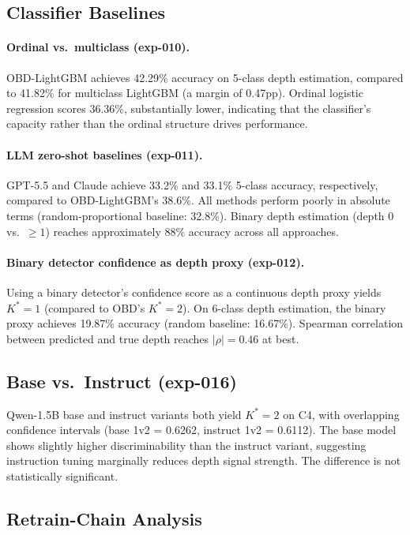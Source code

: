 \documentclass[11pt,a4paper]{article}
\begin{document}
\subsection{Classifier Baselines}
\label{sec:baselines}

\paragraph{Ordinal vs.\ multiclass (exp-010).}
OBD-LightGBM achieves 42.29\% accuracy on 5-class depth estimation, compared to 41.82\% for multiclass LightGBM (a margin of 0.47pp). Ordinal logistic regression scores 36.36\%, substantially lower, indicating that the classifier's capacity rather than the ordinal structure drives performance.

\paragraph{LLM zero-shot baselines (exp-011).}
GPT-5.5 and Claude achieve 33.2\% and 33.1\% 5-class accuracy, respectively, compared to OBD-LightGBM's 38.6\%. All methods perform poorly in absolute terms (random-proportional baseline: 32.8\%). Binary depth estimation (depth 0 vs.\ $\geq 1$) reaches approximately 88\% accuracy across all approaches.

\paragraph{Binary detector confidence as depth proxy (exp-012).}
Using a binary detector's confidence score as a continuous depth proxy yields $K^* = 1$ (compared to OBD's $K^* = 2$). On 6-class depth estimation, the binary proxy achieves 19.87\% accuracy (random baseline: 16.67\%). Spearman correlation between predicted and true depth reaches $|\rho| = 0.46$ at best.

\subsection{Base vs.\ Instruct (exp-016)}

Qwen-1.5B base and instruct variants both yield $K^* = 2$ on C4, with overlapping confidence intervals (base 1v2 = 0.6262, instruct 1v2 = 0.6112). The base model shows slightly higher discriminability than the instruct variant, suggesting instruction tuning marginally reduces depth signal strength. The difference is not statistically significant.

\subsection{Retrain-Chain Analysis}
\label{sec:retrain}
\end{document}

